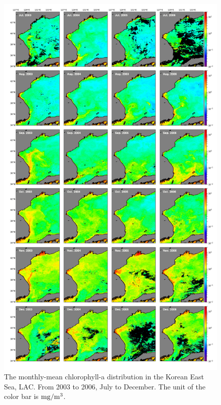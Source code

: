 \begin{figure}
	\centering
	\includegraphics[width=0.8\linewidth]{../images/noname02}
	\caption{The monthly-mean chlorophyll-a distribution in the Korean East Sea, LAC. From 2003 to 2006, July to December. The unit of the color bar is $\rm mg/m^3$.}
	\label{fig:noname02}
\end{figure}

